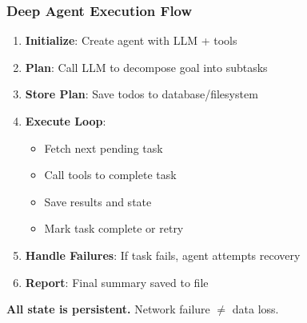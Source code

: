 \documentclass[aspectratio=169,11pt]{beamer}
\begin{document}
\begin{frame}[fragile]
\frametitle{Deep Agent Execution Flow}

\begin{enumerate}
    \setlength{\itemsep}{1pt}
  \item \textbf{Initialize}: Create agent with LLM + tools
  \item \textbf{Plan}: Call LLM to decompose goal into subtasks
  \item \textbf{Store Plan}: Save todos to database/filesystem
  \item \textbf{Execute Loop}:
  \begin{itemize}
    \setlength{\itemsep}{1pt}
    \item Fetch next pending task
    \item Call tools to complete task
    \item Save results and state
    \item Mark task complete or retry
  \end{itemize}
  \item \textbf{Handle Failures}: If task fails, agent attempts recovery
  \item \textbf{Report}: Final summary saved to file
\end{enumerate}

\vspace{1em}
\begin{center}
\textcolor{lcblue}{\textbf{All state is persistent.}} Network failure $\neq$ data loss.
\end{center}

\end{frame}
\end{document}
